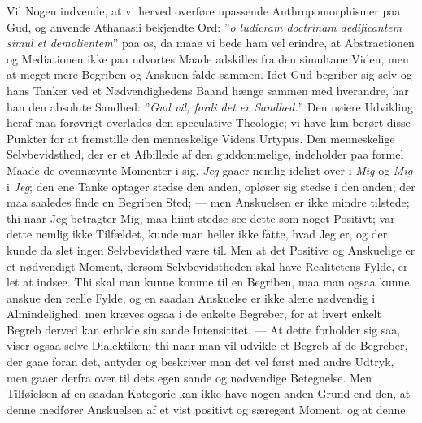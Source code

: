 \documentclass[12pt]{book}
\newcommand{\opage}[1]{\marginnote{\footnotesize\textit{[#1]}}}
\begin{document}
Vil Nogen indvende, at vi herved overføre upassende Anthropomorphismer paa Gud,
og anvende Athanasii bekjendte Ord: ”\textit{o ludicram doctrinam aedificantem
simul et demolientem}” paa os, da maae vi bede ham vel erindre, at
Abstractionen og Mediationen ikke paa udvortes Maade adskilles fra den
simultane Viden, men at meget mere Begriben og Anskuen falde sammen. Idet Gud
begriber sig selv og hans Tanker ved et Nødvendighedens Baand hænge sammen med
hverandre, har han den absolute Sandhed: ”\emph{Gud vil, fordi det er
Sandhed.}” Den nøiere Udvikling heraf maa forøvrigt overlades den speculative
Theologie; vi have kun berørt disse Punkter for at fremstille den menneskelige
Videns Urtypus.
\opage{45} Den menneskelige Selvbevidsthed, der er et Afbillede af den guddommelige,
indeholder paa formel Maade de ovennævnte Momenter i sig. \emph{Jeg} gaaer
nemlig ideligt over i \emph{Mig} og \emph{Mig} i \emph{Jeg}; den ene Tanke
optager stedse den anden, opløser sig stedse i den anden; der maa saaledes
finde en Begriben Sted; --- men Anskuelsen er ikke mindre tilstede; thi naar
Jeg betragter Mig, maa hiint stedse see dette som noget Positivt; var dette
nemlig ikke Tilfældet, kunde man heller ikke fatte, hvad Jeg er, og der kunde
da slet ingen Selvbevidsthed være til. Men at det Positive og Anskuelige er et
nødvendigt Moment, dersom Selvbevidstheden skal have Realitetens Fylde, er let
at indsee. Thi skal man kunne komme til en Begriben, maa man ogsaa kunne anskue
den reelle Fylde, og en saadan Anskuelse er ikke alene nødvendig i
Almindelighed, men kræves ogsaa i de enkelte Begreber, for at hvert enkelt
Begreb derved kan erholde sin sande Intensititet. --- At dette forholder sig
saa, viser ogsaa selve Dialektiken; thi naar man vil udvikle et Begreb af de
Begreber, der gaae foran det, antyder og beskriver man det vel først med andre
Udtryk, men gaaer derfra over til dets egen sande og nødvendige Betegnelse. Men
Tilføielsen af en saadan Kategorie kan ikke have nogen anden Grund end den, at
denne medfører Anskuelsen af et vist positivt og særegent Moment, og at denne
\end{document}
